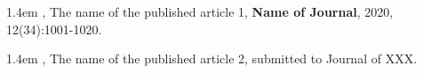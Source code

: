 \documentclass{shnuthesis}
\begin{document}
\backmatter  %





% 
% 





%
%
%
%
%
%




\begin{researchpage}
\hangindent 1.4em
,  The name of the published article 1, {\bf  Name of Journal}, 2020, 12(34):1001-1020.

\hangindent 1.4em
, The name of the published article 2, submitted to
Journal of XXX.


\end{researchpage}



\end{document}
